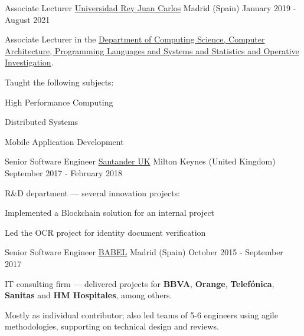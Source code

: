 \begin{cventries}

  \cventry
    {Associate Lecturer} %
    {\href{https://www.urjc.es}{Universidad Rey Juan Carlos}} %
    {Madrid (Spain)} %
    {January 2019 - August 2021} %
    {
      \begin{cvitems}%
        \item[] Associate Lecturer in the \href{https://gestion2.urjc.es/pdi/departamento/Y157}{Department of Computing Science, Computer Architecture, Programming Languages and Systems and Statistics and Operative Investigation}.
        \item[]
        \item[] Taught the following subjects:
        \item[]
        \item {High Performance Computing}
        \item {Distributed Systems}
        \item {Mobile Application Development}
      \end{cvitems}
    }


  \cventry
    {Senior Software Engineer} %
    {\href{https://www.santander.co.uk}{Santander UK}} %
    {Milton Keynes (United Kingdom)} %
    {September 2017 - February 2018} %
    {
      \begin{cvitems}%
        \item[] R\&D department — several innovation projects:
        \item[]
        \item {Implemented a Blockchain solution for an internal project}
        \item {Led the OCR project for identity document verification}
      \end{cvitems}
    }


  \cventry
    {Senior Software Engineer} %
    {\href{https://babel.es/en}{BABEL}} %
    {Madrid (Spain)} %
    {October 2015 - September 2017} %
    {
      \begin{cvitems}%
        \item[] IT consulting firm — delivered projects for \textbf{BBVA}, \textbf{Orange}, \textbf{Telefónica}, \textbf{Sanitas} and \textbf{HM Hospitales}, among others.
        \item[]
        \item[] Mostly as individual contributor; also led teams of 5-6 engineers using agile methodologies, supporting on technical design and reviews.
      \end{cvitems}
    }


\end{cventries}
